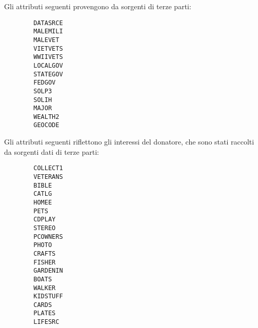Gli attributi seguenti provengono da sorgenti di terze parti:
\begin{multicols}{3}
	\begin{verbatim}
		DATASRCE
		MALEMILI
		MALEVET
		VIETVETS
		WWIIVETS
		LOCALGOV
		STATEGOV
		FEDGOV
		SOLP3
		SOLIH
		MAJOR
		WEALTH2
		GEOCODE
	\end{verbatim}
\end{multicols}

Gli attributi seguenti riflettono gli interessi del donatore, che sono stati raccolti da sorgenti dati di terze parti:

\begin{multicols}{3}
	\begin{verbatim}
		COLLECT1
		VETERANS
		BIBLE
		CATLG
		HOMEE
		PETS
		CDPLAY
		STEREO
		PCOWNERS
		PHOTO
		CRAFTS
		FISHER
		GARDENIN
		BOATS
		WALKER
		KIDSTUFF
		CARDS
		PLATES
		LIFESRC
	\end{verbatim}
\end{multicols}

